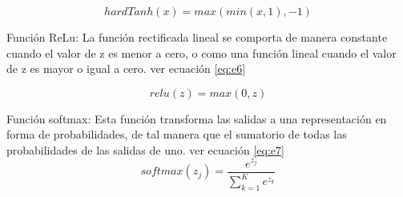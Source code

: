 \begin{equation} \label{eq:e5} 
	hardTanh(x)=max(min(x,1), -1)
\end{equation}

	
	
Función ReLu: La función rectificada lineal se comporta de manera constante cuando el valor de z es menor a cero, o como una función lineal cuando el valor de z es mayor o igual a cero. ver ecuación \ref{eq:e6}

\begin{equation} \label{eq:e6} 
	relu(z)=max(0,z)
\end{equation}


Función softmax: Esta función transforma las salidas a una representación en forma de probabilidades, de tal manera que el sumatorio de todas las probabilidades de las salidas de uno. ver ecuación \ref{eq:e7}
\begin{equation} \label{eq:e7} 
	softmax(z_{j})=\frac{e^{z_{j}}}{\displaystyle\sum_{k=1}^{K}e^{z_{k}}}
\end{equation}



